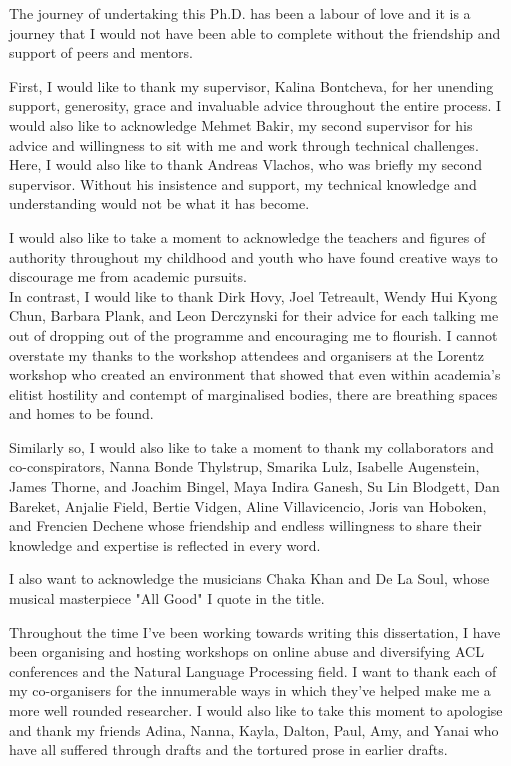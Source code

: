 
\begin{acknowledgements}      

The journey of undertaking this Ph.D. has been a labour of love and it is a journey that I would not have been able to complete without the friendship and support of peers and mentors.

First, I would like to thank my supervisor, Kalina Bontcheva, for her unending support, generosity, grace and invaluable advice throughout the entire process.
I would also like to acknowledge Mehmet Bakir, my second supervisor for his advice and willingness to sit with me and work through technical challenges.
Here, I would also like to thank Andreas Vlachos, who was briefly my second supervisor. 
Without his insistence and support, my technical knowledge and understanding would not be what it has become.

I would also like to take a moment to acknowledge the teachers and figures of authority throughout my childhood and youth who have found creative ways to discourage me from academic pursuits.\\
In contrast, I would like to thank Dirk Hovy, Joel Tetreault, Wendy Hui Kyong Chun, Barbara Plank, and Leon Derczynski for their advice for each talking me out of dropping out of the programme and encouraging me to flourish.
I cannot overstate my thanks to the workshop attendees and organisers at the Lorentz workshop who created an environment that showed that even within academia's elitist hostility and contempt of marginalised bodies, there are breathing spaces and homes to be found.

Similarly so, I would also like to take a moment to thank my collaborators and co-conspirators, Nanna Bonde Thylstrup, Smarika Lulz, Isabelle Augenstein, James Thorne, and Joachim Bingel, Maya Indira Ganesh, Su Lin Blodgett, Dan Bareket, Anjalie Field, Bertie Vidgen, Aline Villavicencio, Joris van Hoboken, and Frencien Dechene whose friendship and endless willingness to share their knowledge and expertise is reflected in every word.

I also want to acknowledge the musicians Chaka Khan and De La Soul, whose musical masterpiece "All Good" I quote in the title.

Throughout the time I've been working towards writing this dissertation, I have been organising and hosting workshops on online abuse and diversifying ACL conferences and the Natural Language Processing field.
I want to thank each of my co-organisers for the innumerable ways in which they've helped make me a more well rounded researcher.
I would also like to take this moment to apologise and thank my friends Adina, Nanna, Kayla, Dalton, Paul, Amy, and Yanai who have all suffered through drafts and the tortured prose in earlier drafts.


\end{acknowledgements}
